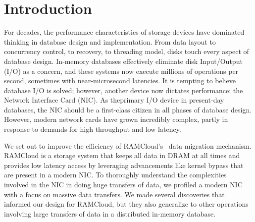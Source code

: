 
\chapter{Introduction}
\label{chap:intro}
For decades, the performance characteristics of storage devices have dominated \linebreak
 thinking in database design and implementation. From data layout to
concurrency \linebreak control, to recovery, to threading model, disks touch every aspect
of database design. \linebreak In-memory databases effectively eliminate disk Input/Output (I/O) as a
concern, and these systems now execute millions of operations per second,
sometimes with \linebreak near-microsecond latencies.  It is tempting to believe 
database I/O is solved; however, \linebreak another device now dictates
performance: the Network Interface Card (NIC). As the\linebreak primary I/O device in present-day databases,
the NIC should be a first-class citizen in all phases of database design.
However, modern network cards have grown incredibly complex, partly in response
to demands for high throughput and low latency.

We set out to improve the efficiency of RAMCloud's~\cite{ramcloud} data migration mechanism. 
RAMCloud is a storage system that keeps all data in DRAM at all times and provides low latency access by
leveraging advancements like kernel bypass that are present in a \linebreak modern NIC.
To thoroughly understand the complexities involved in the NIC in doing huge
transfers of data, we profiled a modern NIC with a focus on massive data \linebreak transfers.
 We made several discoveries that informed our design for RAMCloud,
 but they also generalize to other operations involving large transfers of data in a distributed in-memory database. 

